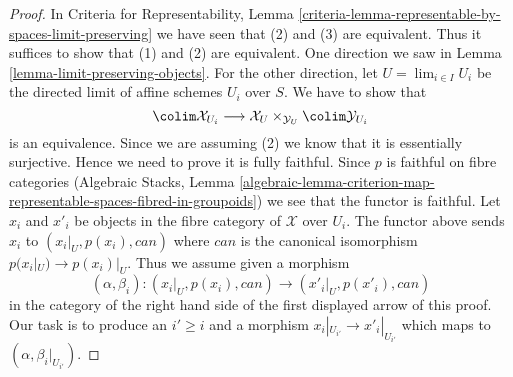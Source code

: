 \begin{proof}
In Criteria for Representability, Lemma
\ref{criteria-lemma-representable-by-spaces-limit-preserving}
we have seen that (2) and (3) are equivalent.
Thus it suffices to show that (1) and (2) are equivalent.
One direction we saw in Lemma \ref{lemma-limit-preserving-objects}.
For the other direction, let $U = \lim_{i \in I} U_i$ be the directed limit
of affine schemes $U_i$ over $S$. We have to show that
$$
\colim \mathcal{X}_{U_i} \longrightarrow
\mathcal{X}_U \times_{\mathcal{Y}_U} \colim \mathcal{Y}_{U_i}
$$
is an equivalence. Since we are assuming (2) we know that it is essentially
surjective. Hence we need to prove it is fully faithful.
Since $p$ is faithful on fibre categories
(Algebraic Stacks, Lemma
\ref{algebraic-lemma-criterion-map-representable-spaces-fibred-in-groupoids})
we see that the functor is faithful. Let $x_i$ and $x'_i$ be objects
in the fibre category of $\mathcal{X}$ over $U_i$.
The functor above sends $x_i$ to $(x_i|_U, p(x_i), can)$ where
$can$ is the canonical isomorphism $p(x_i|_U) \to p(x_i)|_U$.
Thus we assume given a morphism
$$
(\alpha, \beta_i) : (x_i|_U, p(x_i), can) \longrightarrow
(x'_i|_U, p(x'_i), can)
$$
in the category of the right hand side of the first displayed arrow
of this proof. Our task is to produce an $i' \geq i$ and a morphism
$x_i|_{U_{i'}} \to x'_i|_{U_{i'}}$ which maps to
$(\alpha, \beta_i|_{U_{i'}})$.


\end{proof}
